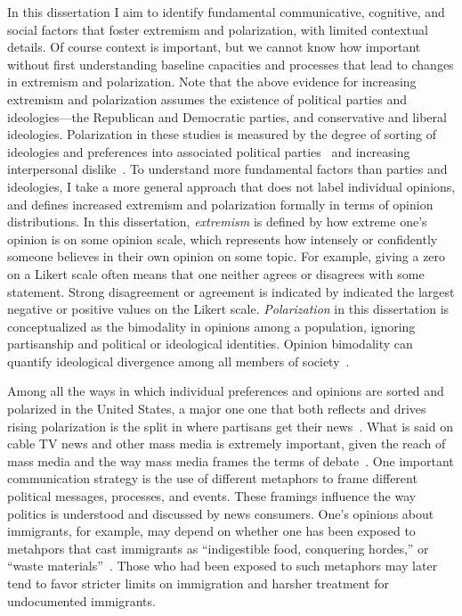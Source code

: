 In this dissertation I aim to identify fundamental communicative, cognitive, and
social factors that foster extremism and polarization, with limited contextual
details. Of course context is important, but we cannot know how important without
first understanding baseline capacities and processes that lead to changes in
extremism and polarization. Note that the above evidence
for increasing extremism and polarization
assumes the existence of political parties and ideologies---the 
Republican and Democratic parties, and conservative and liberal ideologies.
Polarization in these studies is measured by the degree of sorting of ideologies and preferences
into associated political parties~\cite{Mason2015} and increasing interpersonal 
dislike~\cite{Iyengar2019}. To understand more fundamental factors than 
parties and ideologies, I take a more general approach that does not label 
individual opinions, and defines increased extremism and polarization formally
in terms of opinion distributions. In this dissertation, \emph{extremism} is 
defined by how extreme one's opinion is on some opinion 
scale, which represents how intensely or confidently someone believes in their
own opinion on some topic.  For example, giving a zero on a Likert scale often means that one 
neither agrees or disagrees with some statement. Strong disagreement or agreement
is indicated by indicated the largest negative or positive values on the Likert
scale. \emph{Polarization} in this dissertation is 
conceptualized as the bimodality in opinions among a population, ignoring 
partisanship and political or ideological identities. Opinion bimodality
can quantify ideological divergence among all members of 
society~\cite{Bramson2016,Lelkes2016}. 

Among all the ways in which individual preferences and opinions are sorted and 
polarized in the United States, a
major one one that both reflects and drives rising polarization is the split in
where partisans get their news~\cite{Pew2014PolarizationAndMediaHabits,Martin2017}. 
What is said on cable TV news and other mass media is extremely important, given
the reach of mass media and the way mass media frames the terms of debate~\cite{Chong2007}.
One important communication strategy is the use of different 
metaphors to frame different political
messages, processes, and events. These framings influence the way politics is 
understood and discussed by news consumers. One's opinions about immigrants, for example, may depend
on whether one has been exposed to metahpors that cast immigrants as 
``indigestible food, conquering hordes,'' or ``waste materials''~\cite{OBrien2003}.
Those who had been exposed to such metaphors may later tend to favor stricter limits
on immigration and harsher treatment for undocumented immigrants.

